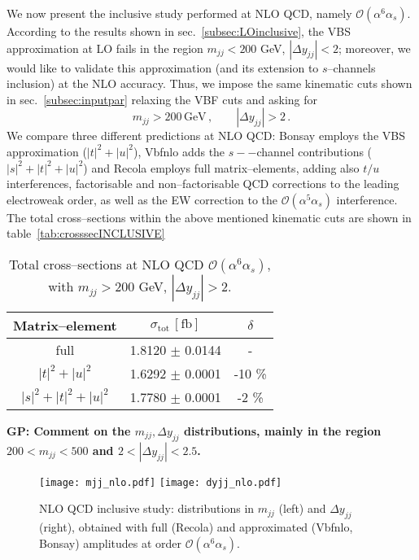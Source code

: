 We now present the inclusive study performed at NLO QCD, namely $\mathcal{O}(\alpha^6\alpha_s)$.\\
According to the results shown in sec.~\ref{subsec:LOinclusive}, the VBS approximation at LO fails in the region $m_{jj} < 200$ GeV, $|\Delta y_{jj}| < 2$; moreover, we would like to validate this approximation (and its extension to $s$--channels inclusion) at the NLO accuracy. Thus, we impose the same kinematic cuts shown in sec.~\ref{subsec:inputpar} relaxing the VBF cuts and asking for
\begin{equation}
	m_{jj} > 200 \,\textrm{GeV}\,,\qquad |\Delta y_{jj}| > 2\,.
\end{equation}
We compare three different predictions at NLO QCD: {\sc Bonsay} employs the VBS approximation ($|t|^2+|u|^2$), {\sc Vbfnlo} adds the $s--$channel contributions ($|s|^2+|t|^2+|u|^2$) and {\sc Recola} employs full matrix--elements, adding also $t/u$ interferences, factorisable and non--factorisable QCD corrections to the leading electroweak order, as well as the EW correction to the $\mathcal{O}(\alpha^5\alpha_s)$ interference. The total cross--sections within the above mentioned kinematic cuts are shown in table~\ref{tab:crosssecINCLUSIVE}
\begin{table}[h!]
\centering
\begin{tabular}{c|c|c} 
\bf Matrix--element & $\sigma_{\textrm{tot}}\,[\textrm{fb}]$ & $\delta$ \\
\hline
\hline
full &  1.8120 $\pm$ 0.0144 & - \\
\hline
$|t|^2 + |u|^2$ & 1.6292 $\pm$ 0.0001  &  -10 \% \\
\hline
$|s|^2 + |t|^2 + |u|^2$ & 1.7780 $\pm$ 0.0001  & -2 \%
\end{tabular}
\caption{Total cross--sections at NLO QCD $\mathcal{O}(\alpha^6\alpha_s)$, with $m_{jj}>200$ GeV, $|\Delta y_{jj}|>2$.}
\end{table}\label{tab:crosssecINCLUSIVE}


{\bf GP: Comment on the $m_{jj}, \Delta y_{jj}$ distributions, mainly in the region $200 < m_{jj} < 500$ and $2<|\Delta y_{jj}|<2.5$.}
\begin{figure}[hbt]
\centering
{\texttt{[image: mjj\_nlo.pdf]}}
{\texttt{[image: dyjj\_nlo.pdf]}}
\caption{NLO QCD inclusive study: distributions in $m_{jj}$ (left) and $\Delta y_{jj}$ (right), obtained with full ({\sc Recola}) and approximated ({\sc Vbfnlo, Bonsay}) amplitudes at order $\mathcal{O}(\alpha^6\alpha_s)$.} \label{fig:mjjdyjj_1d_1}
\end{figure}

